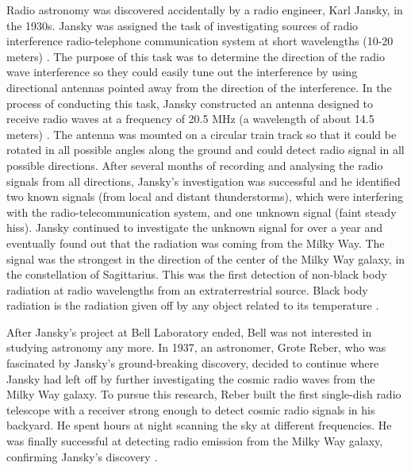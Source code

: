 Radio astronomy was discovered accidentally by a radio engineer, Karl Jansky, in the 1930s.
Jansky was assigned the task of investigating sources of radio interference radio-telephone communication system at short wavelengths (10-20 meters) \citep{verschuur2015invisible}.
The purpose of this task was to determine the direction of the radio wave interference so they could easily tune out the interference by using directional antennas pointed away from the direction of the interference. In the process of conducting this task, Jansky constructed an antenna designed to receive radio waves at a frequency of 20.5 MHz (a wavelength of about 14.5 meters) \citep{Jansky0}. The antenna was mounted on a circular train track so that it could be rotated in all possible angles along the ground and could detect radio signal in all possible directions. After several months of recording and analysing the radio signals from all directions, Jansky's investigation was successful and he identified two known signals (from local and  distant thunderstorms), which were interfering with the radio-telecommunication system, and one unknown signal (faint steady hiss). Jansky continued to investigate the unknown signal for over a year and eventually found out that the radiation was coming from the Milky Way. The signal was the strongest in the direction of the center of the Milky Way
galaxy, in the constellation of Sagittarius. This was the first detection of non-black body radiation at radio wavelengths from an extraterrestrial source. Black body radiation is the radiation given off by any object
related to its temperature \citep{Jansky1}.

After Jansky's project at Bell Laboratory ended, Bell was not interested in studying astronomy any more. In 1937, an astronomer, Grote Reber, who was fascinated by Jansky's ground-breaking discovery, decided to continue where Jansky had left off by further investigating the cosmic radio waves from the Milky Way galaxy. To pursue this research, Reber built the first single-dish radio telescope with a receiver strong enough to detect cosmic radio signals in his backyard. He spent hours at night scanning the sky at different frequencies. He was finally successful at detecting radio emission from the Milky Way galaxy, confirming Jansky's discovery \citep{verschuur2015invisible}.   


